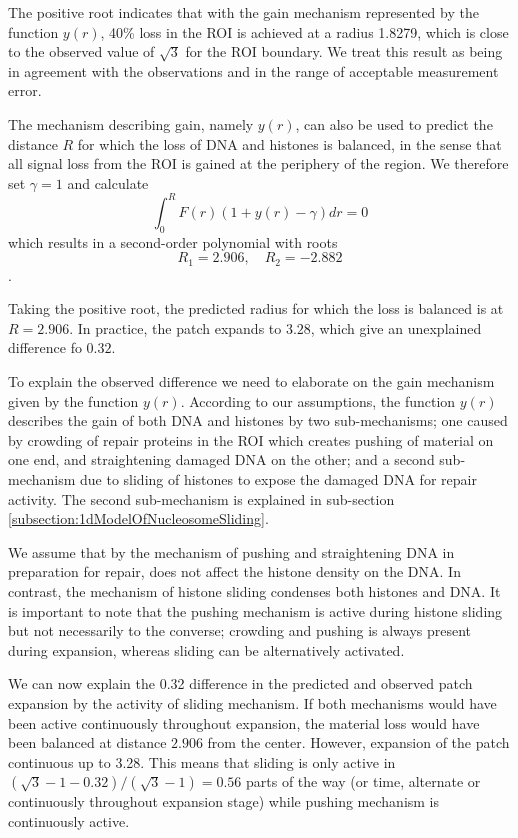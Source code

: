 \documentclass[12pt]{report}
\begin{document}
The positive root indicates that with the gain mechanism represented by the function $y(r)$, 40\% loss in the ROI is achieved at a radius 1.8279, which is close to the observed value of $\sqrt{3}$ for the ROI boundary. We treat this result as being in agreement with the observations and in the range of acceptable measurement error.

The mechanism describing gain, namely $y(r)$, can also be used to predict the distance $R$ for which the loss of DNA and histones is balanced, in the sense that all signal loss from the ROI is gained at the periphery of the region. We therefore set $\gamma =1$ and calculate
\begin{equation*}
\int_0^R F(r)(1+y(r)-\gamma)dr = 0
\end{equation*}
which results in a second-order polynomial with roots 
\begin{equation*}
R_1=2.906, \quad R_2=-2.882
\end{equation*}.

Taking the positive root, the predicted radius for which the loss is balanced is at $R=2.906$. In practice, the patch expands to $3.28$, which give an unexplained difference fo $0.32$. 

To explain the observed difference we need to elaborate on the gain mechanism given by the function $y(r)$. According to our assumptions, the function $y(r)$ describes the gain of both DNA and histones by two sub-mechanisms; one caused by crowding of repair proteins in the ROI which creates pushing of material on one end, and straightening damaged DNA on the other; and a second sub-mechanism due to sliding of histones to expose the damaged DNA for repair activity. The second sub-mechanism is explained in sub-section \ref{subsection:1dModelOfNucleosomeSliding}.  

We assume that by the mechanism of pushing and straightening DNA in preparation for repair, does not affect the histone density on the DNA. In contrast, the mechanism of histone sliding condenses both histones and DNA. It is important to note that the pushing mechanism is active during histone sliding but not necessarily to the converse; crowding and pushing is always present during expansion, whereas sliding can be alternatively activated. 

We can now explain the 0.32 difference in the predicted and observed patch expansion by the activity of sliding mechanism. 
If both mechanisms would have been active continuously throughout expansion, the material loss would have been balanced at distance $2.906$ from the center. However, expansion of the patch continuous up to 3.28. This means that sliding is only active in $(\sqrt{3}-1-0.32)/(\sqrt{3}-1) =0.56$  parts of the way (or time, alternate or continuously throughout expansion stage) while pushing mechanism is continuously active.
\end{document}
